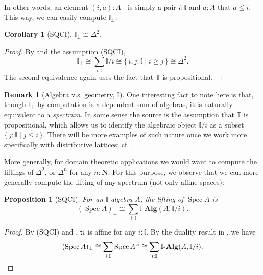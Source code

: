 \documentclass[12pt]{amsart}
\newtheorem{corollary}[theorem]{Corollary}
\newtheorem{proposition}[theorem]{Proposition}
\theoremstyle{definition}
\newtheorem{remark}[theorem]{Remark}
\newtheorem*{axiom}{Axiom}
\newcommand{\mb}[1]{\mathbf{#1}}
\newcommand{\mbb}[1]{\mathbb{#1}}
\newcommand{\T}{\mbb T}
\newcommand{\I}{\mbb I}
\newcommand{\ms}[1]{\mathsf{#1}}
\newcommand{\alg}{\text{-}\mb{Alg}}
\newcommand{\scomp}[2]{\{\,#1\mid#2\,\}}
\newcommand{\N}{\mb N}
\newcommand{\prt}{_{\bot}}
\newcommand{\spec}{\operatorname{Spec}}
\begin{document}
In other words, an element $(i,a) : A\prt$ is simply a pair $i : \I$ and $a : A$ that $a \le i$. This way, we can easily compute $\I\prt$:

\begin{corollary}[SQCI]
  $\I\prt \cong \Delta^2$.
\end{corollary}
\begin{proof}
  By  and the assumption (SQCI),
  \[ \I\prt \cong \sum_{i:\I}\I/i \cong \scomp{i,j : \I}{i \ge j} \cong \Delta^2. \]
  The second equivalence again uses the fact that $\T$ is propositional.
\end{proof}

\begin{remark}[Algebra v.s. geometry, I]
  One interesting fact to note here is that, though $\I\prt$ by computation is a dependent sum of algebras, it is naturally equivalent to a \emph{spectrum}. In some sense the source is the assumption that $\T$ is propositional, which allows us to identify the algebraic object $\I/i$ as a subset $\scomp{j : \I}{j \le i}$. There will be more examples of such nature once we work more specifically with distributive lattices; cf. .
\end{remark}

More generally, for domain theoretic applications we would want to compute the liftings of $\Delta^2$, or $\Delta^n$ for any $n:\N$. For this purpose, we observe that we can more generally compute the lifting of any spectrum (not only affine spaces):

\begin{proposition}[SQCI]\label{prop:liftofaffine}
  For an $\I$-algebra $A$, the lifting of $\spec A$ is
  \[ (\spec A)\prt \cong \sum_{i:\I}\I\alg(A,\I/i). \]
\end{proposition}
\begin{proof}
  By (SQCI) and , $\ms ti$ is affine for any $i:\I$. By the duality result in , we have
  \[ (\spec A)\prt \cong \sum_{i:\I}\spec A^{\ms ti}\cong \sum_{i:\I}\I\alg(A,\I/i). \qedhere \]
\end{proof}


\end{document}
